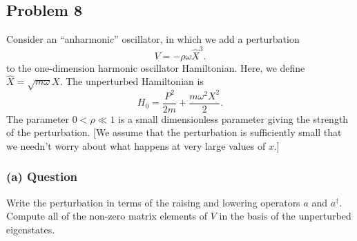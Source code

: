 \documentclass{article}
\begin{document}
\subsection*{Problem 8}
Consider an ``anharmonic'' oscillator, in which we add a perturbation
\begin{equation}
    V = -\rho \omega \hat{X}^3.
\end{equation}
to the one-dimension harmonic oscillator Hamiltonian. Here, we define $ \hat{X} = \sqrt{m\omega}X$. The unperturbed Hamiltonian is
\begin{equation}
    H_0 = \frac{P^2}{2m} + \frac{m\omega^2 X^2}{2}.
\end{equation}
The parameter \( 0 < \rho \ll 1 \) is a small dimensionless parameter giving the strength of the perturbation. [We assume that the perturbation is sufficiently small that we needn't worry about what happens at very large values of \( x \).]

\subsubsection*{(a) Question}
Write the perturbation in terms of the raising and lowering operators \( a \) and \( a^\dagger \). Compute all of the non-zero matrix elements of \( V \) in the basis of the unperturbed eigenstates.
\end{document}
